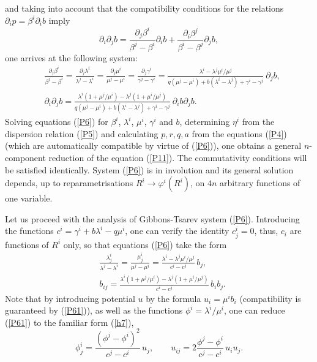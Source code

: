 \documentclass[12pt, a4paper]{article}
\theoremstyle{definition}
\begin{document}
and taking into account that the compatibility conditions for the relations $\partial_i p=\beta^i\partial_i b$ imply
$$
\partial_i\partial_jb=\frac{\partial_j\beta^i}{\beta^j-\beta^i}\partial_ib+\frac{\partial_i\beta^j}{\beta^i-\beta^j}\partial_jb,
$$
one arrives at the following system:
\begin{equation}
\begin{split}
& \frac{\partial_j\beta^i}{\beta^j-\beta^i}=\frac{\partial_j\lambda^i}{\lambda^j-\lambda^i}=
\frac{\partial_j\mu^i}{\mu^j-\mu^i}=\frac{\partial_j\gamma^i}{\gamma^j-\gamma^i}=
\frac{\lambda^i-\lambda^j\mu^i/\mu^j}{q(\mu^j-\mu^i)+b(\lambda^i-\lambda^j)+\gamma^i-\gamma^j}
\ \partial_jb, \\
& \partial_i\partial_jb=
\frac{\lambda^i(1+\mu^j/\mu^i)-\lambda^j(1+\mu^i/\mu^j)}{q(\mu^j-\mu^i)+b(\lambda^i-\lambda^j)+\gamma^i-\gamma^j}\ \partial_ib\partial_jb.
\end{split}
\label{P6}
\end{equation}
Solving   equations (\ref{P6}) for $\beta^i$, $\lambda^i$, $\mu^i$,  $\gamma^i$ and $b$, determining $\eta^i$ from the dispersion relation (\ref{P5}) and calculating $p, r, q, a$ from the equations (\ref{P4}) 
(which are automatically compatible by virtue of (\ref{P6})), one obtains a general $n$-component  reduction of the  equation (\ref{P11}).
The commutativity conditions  will  be satisfied identically.
System (\ref{P6}) is in involution and its general solution depends, up to
reparametrisations $R^i\to \varphi^i(R^i)$,  on $4n$ arbitrary functions of one variable.


Let us proceed with the analysis of Gibbons-Tsarev system (\ref{P6}).  Introducing the functions $c^i=\gamma^i+b\lambda^i-q \mu^i$, one can verify the identity $c^i_j=0$, thus, $c_i$ are functions of $R^i$ only, so that equations (\ref{P6}) take the form
\begin{equation}
\begin{split}
& \frac{\lambda^i_j}{\lambda^j-\lambda^i}=
\frac{\mu^i_j}{\mu^j-\mu^i}=
\frac{\lambda^i-\lambda^j\mu^i/\mu^j}{c^i-c^j}
\, b_j, \\
& b_{ij}=
\frac{\lambda^i(1+\mu^j/\mu^i)-\lambda^j(1+\mu^i/\mu^j)}{c^i-c^j}\, b_ib_j.
\end{split}
\label{P61}
\end{equation}
Note that by introducing potential $u$ by the formula
$u_i=\mu^ib_i$ (compatibility is guaranteed by (\ref{P61})), as well as the functions $\phi^i= \lambda^i / \mu^i$, one can reduce (\ref{P61}) to the familiar form (\ref{h7}),
$$
\phi^i_j=\frac{(\phi^j-\phi^i)^2}{c^j-c^i}\, u_j, \qquad u_{ij}=2\frac{\phi^j-\phi^i}{c^j-c^i}\, u_iu_j.  
$$
\end{document}
